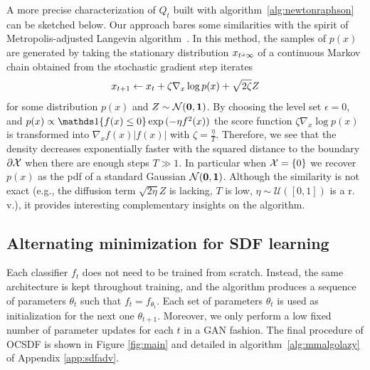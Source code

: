 \begin{remark}\label{remark:metropolis}
A more precise characterization of $Q_t$ built with algorithm~\ref{alg:newtonraphson} can be sketched below. Our approach bares some similarities with the spirit of Metropolis-adjusted Langevin algorithm~\cite{grenander1994representations}. In this method, the samples of $p(x)$ are generated by taking the stationary distribution $x_{t\veryshortarrow\infty}$ of a continuous Markov chain obtained from the stochastic gradient step iterates 
\vspace{-0.2cm}
\begin{equation}
\vspace{-0.2cm}
x_{t+1}\gets x_t+\zeta\nabla_x \log{p(x)}+\sqrt{2\zeta}Z
\end{equation}
for some distribution $p(x)$ and $Z\sim\mathcal{N}(\bf 0,\bf 1)$. By choosing the level set $\epsilon=0$, and $p(x)\propto\indicator\{f(x)\leq 0\}\exp{(-\eta f^2(x))}$ the score function $\zeta\nabla_x \log{p(x)}$ is transformed into $\nabla_x f(x)|f(x)|$ with $\zeta=\frac{\eta}{T}$. Therefore, we see that the density decreases exponentially faster with the squared distance to the boundary $\partial\mathcal{X}$ when there are enough steps $T\gg 1$. In particular when $\mathcal{X} = \{0\}$ we recover $p(x)$ as the pdf of a standard Gaussian $\mathcal{N}(\bf 0,\bf 1)$. Although the similarity is not exact (e.g., the diffusion term $\sqrt{2\eta}Z$ is lacking, $T$ is low, $\eta\sim\mathcal{U}([0,1])$ is a r. v.), it provides interesting complementary insights on the algorithm.  
\end{remark}

\subsection{Alternating minimization for SDF learning}

Each classifier $f_t$ does not need to be trained from scratch. Instead, the same architecture is kept throughout training, and the algorithm produces a sequence of parameters $\theta_t$ such that $f_t=f_{\theta_t}$. Each set of parameters $\theta_t$ is used as initialization for the next one $\theta_{t+1}$. Moreover, we only perform a low fixed number of parameter updates for each $t$ in a GAN fashion. The final procedure of OCSDF is shown in Figure \ref{fig:main} and detailed in algorithm~\ref{alg:mmalgolazy} of Appendix \ref{app:sdfadv}.






